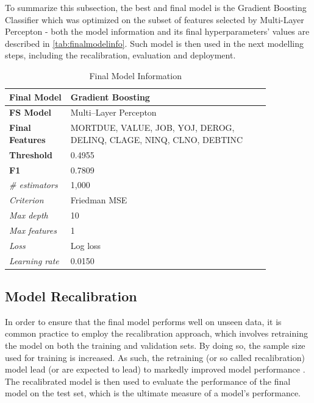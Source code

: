 To summarize this subsection, the best and final model is the Gradient Boosting Classifier which was optimized on the subset of features selected by Multi-Layer Percepton - both the model information and its final hyperparameters' values are described in \autoref{tab:finalmodelinfo}. Such model is then used in the next modelling steps, including the recalibration, evaluation and deployment.
\begin{table}[H]
    \small
    \setlength{\tabcolsep}{8pt}
    \renewcommand{\arraystretch}{1.3}
    \centering
    \caption{Final Model Information}\label{tab:finalmodelinfo}
    \begin{tabular}{>{\raggedleft\arraybackslash}p{0.20\linewidth}|p{0.65\linewidth}}
    \toprule
    \midrule
    \textbf{Final Model} & Gradient Boosting \\
    \midrule
    \textbf{FS Model} & Multi--Layer Percepton \\
    \midrule
    \textbf{Final Features} &
    MORTDUE, VALUE, JOB, YOJ, DEROG, DELINQ, CLAGE, NINQ, CLNO, DEBTINC \\
    \midrule
    \textbf{Threshold} & 0.4955 \\
    \midrule
    \textbf{F1} & 0.7809 \\
    \midrule
    \textit{\# estimators} & 1,000 \\
    \midrule
    \textit{Criterion} & Friedman MSE \\
    \midrule
    \textit{Max depth} & 10 \\
    \midrule
    \textit{Max features} & 1 \\
    \midrule
    \textit{Loss} & Log loss \\
    \midrule
    \textit{Learning rate} & 0.0150 \\
    \midrule
    \bottomrule
    \end{tabular}
    \vspace{0.5em}
    
    \vspace{-0.5em}
\end{table}

\newpage
\subsection{Model Recalibration}

In order to ensure that the final model performs well on unseen data, it is common practice to employ the recalibration approach, which involves retraining the model on both the training and validation sets.
By doing so, the sample size used for training is increased. As such, the retraining (or so called recalibration) model lead (or are expected to lead) to markedly improved model performance \citep{de2023predicting}.
The recalibrated model is then used to evaluate the performance of the final model on the test set, which is the ultimate measure of a model's performance.

